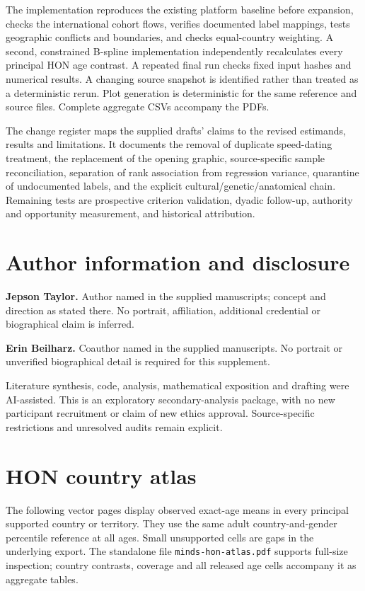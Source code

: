 The implementation reproduces the existing platform baseline before expansion, checks the international cohort flows, verifies documented label mappings, tests geographic conflicts and boundaries, and checks equal-country weighting. A second, constrained B-spline implementation independently recalculates every principal HON age contrast. A repeated final run checks fixed input hashes and numerical results. A changing source snapshot is identified rather than treated as a deterministic rerun. Plot generation is deterministic for the same reference and source files. Complete aggregate CSVs accompany the PDFs.

The change register maps the supplied drafts' claims to the revised estimands, results and limitations. It documents the removal of duplicate speed-dating treatment, the replacement of the opening graphic, source-specific sample reconciliation, separation of rank association from regression variance, quarantine of undocumented labels, and the explicit cultural/genetic/anatomical chain. Remaining tests are prospective criterion validation, dyadic follow-up, authority and opportunity measurement, and historical attribution.

\section*{Author information and disclosure}
\noindent\textbf{Jepson Taylor.} Author named in the supplied manuscripts; concept and direction as stated there. No portrait, affiliation, additional credential or biographical claim is inferred.\par
\noindent\textbf{Erin Beilharz.} Coauthor named in the supplied manuscripts. No portrait or unverified biographical detail is required for this supplement.\par
\noindent Literature synthesis, code, analysis, mathematical exposition and drafting were AI-assisted. This is an exploratory secondary-analysis package, with no new participant recruitment or claim of new ethics approval. Source-specific restrictions and unresolved audits remain explicit.

\clearpage
\section{HON country atlas}
The following vector pages display observed exact-age means in every principal supported country or territory. They use the same adult country-and-gender percentile reference at all ages. Small unsupported cells are gaps in the underlying export. The standalone file \texttt{minds-hon-atlas.pdf} supports full-size inspection; country contrasts, coverage and all released age cells accompany it as aggregate tables.

\clearpage
